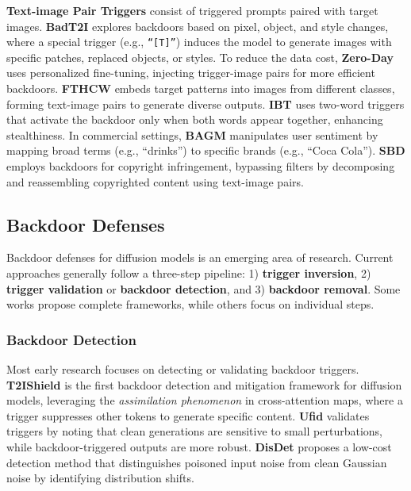 \textbf{Text-image Pair Triggers} consist of triggered prompts paired with target images. \textbf{BadT2I} \cite{zhai2023text} explores backdoors based on pixel, object, and style changes, where a special trigger (e.g., \texttt{“[T]”}) induces the model to generate images with specific patches, replaced objects, or styles. To reduce the data cost, \textbf{Zero-Day} \cite{huang2023zero,huang2024personalization} uses personalized fine-tuning, injecting trigger-image pairs for more efficient backdoors. \textbf{FTHCW} \cite{pan2023trojan} embeds target patterns into images from different classes, forming text-image pairs to generate diverse outputs. \textbf{IBT} \cite{naseh2024injecting} uses two-word triggers that activate the backdoor only when both words appear together, enhancing stealthiness. In commercial settings, \textbf{BAGM} \cite{vice2024bagm} manipulates user sentiment by mapping broad terms (e.g., “drinks”) to specific brands (e.g., “Coca Cola”). \textbf{SBD} \cite{wang2024stronger} employs backdoors for copyright infringement, bypassing filters by decomposing and reassembling copyrighted content using text-image pairs.


\subsection{Backdoor Defenses}
\label{sec:dm_backdoor_defenses}

Backdoor defenses for diffusion models is an emerging area of research. Current approaches generally follow a three-step pipeline: 1) \textbf{trigger inversion}, 2) \textbf{trigger validation} or \textbf{backdoor detection}, and 3) \textbf{backdoor removal}. Some works propose complete frameworks, while others focus on individual steps.


\subsubsection{Backdoor Detection}
Most early research focuses on detecting or validating backdoor triggers. \textbf{T2IShield} \cite{wang2024t2ishield} is the first backdoor detection and mitigation framework for diffusion models, leveraging the \emph{assimilation phenomenon} in cross-attention maps, where a trigger suppresses other tokens to generate specific content. \textbf{Ufid} \cite{guan2024ufid} validates triggers by noting that clean generations are sensitive to small perturbations, while backdoor-triggered outputs are more robust. \textbf{DisDet} \cite{sui2024disdet} proposes a low-cost detection method that distinguishes poisoned input noise from clean Gaussian noise by identifying distribution shifts.



